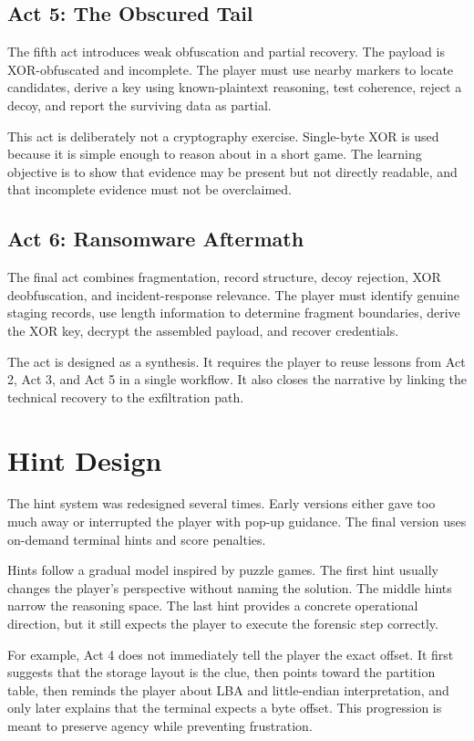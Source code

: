 \documentclass[11pt,a4paper]{article}
\begin{document}
\subsection{Act 5: The Obscured Tail}

The fifth act introduces weak obfuscation and partial recovery. The payload is XOR-obfuscated and incomplete. The player must use nearby markers to locate candidates, derive a key using known-plaintext reasoning, test coherence, reject a decoy, and report the surviving data as partial.

This act is deliberately not a cryptography exercise. Single-byte XOR is used because it is simple enough to reason about in a short game. The learning objective is to show that evidence may be present but not directly readable, and that incomplete evidence must not be overclaimed.

\subsection{Act 6: Ransomware Aftermath}

The final act combines fragmentation, record structure, decoy rejection, XOR deobfuscation, and incident-response relevance. The player must identify genuine staging records, use length information to determine fragment boundaries, derive the XOR key, decrypt the assembled payload, and recover credentials.

The act is designed as a synthesis. It requires the player to reuse lessons from Act 2, Act 3, and Act 5 in a single workflow. It also closes the narrative by linking the technical recovery to the exfiltration path.

\section{Hint Design}

The hint system was redesigned several times. Early versions either gave too much away or interrupted the player with pop-up guidance. The final version uses on-demand terminal hints and score penalties.

Hints follow a gradual model inspired by puzzle games. The first hint usually changes the player's perspective without naming the solution. The middle hints narrow the reasoning space. The last hint provides a concrete operational direction, but it still expects the player to execute the forensic step correctly.

For example, Act 4 does not immediately tell the player the exact offset. It first suggests that the storage layout is the clue, then points toward the partition table, then reminds the player about LBA and little-endian interpretation, and only later explains that the terminal expects a byte offset. This progression is meant to preserve agency while preventing frustration.
\end{document}
